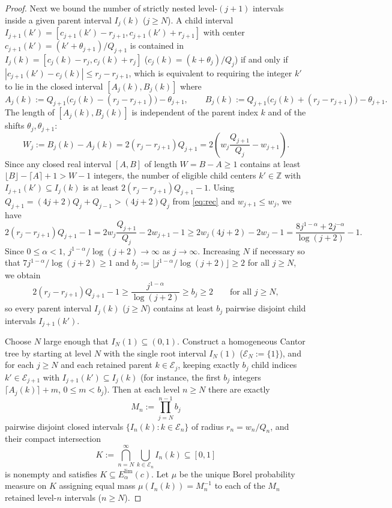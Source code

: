 \documentclass[11pt]{article}
\theoremstyle{definition}
\theoremstyle{remark}
\newcommand{\Z}{\mathbb{Z}}
\begin{document}
\begin{proof}
Next we bound the number of strictly nested level-$(j+1)$ intervals inside a
given parent interval $I_j(k)$ ($j\ge N$). A child interval
$I_{j+1}(k')=[c_{j+1}(k')-r_{j+1},c_{j+1}(k')+r_{j+1}]$ with center
$c_{j+1}(k')=(k'+\theta_{j+1})/Q_{j+1}$ is contained in
$I_j(k)=[c_j(k)-r_j,c_j(k)+r_j]$ ($c_j(k)=(k+\theta_j)/Q_j$) if and only if
$|c_{j+1}(k')-c_j(k)|\le r_j-r_{j+1}$, which is equivalent to requiring the
integer $k'$ to lie in the closed interval $[A_j(k),B_j(k)]$ where
\[
A_j(k):=Q_{j+1}\bigl(c_j(k)-(r_j-r_{j+1})\bigr)-\theta_{j+1},\qquad
B_j(k):=Q_{j+1}\bigl(c_j(k)+(r_j-r_{j+1})\bigr)-\theta_{j+1}.
\]
The length of $[A_j(k),B_j(k)]$ is independent of the parent index $k$ and of
the shifts $\theta_j,\theta_{j+1}$:
\[
W_j:=B_j(k)-A_j(k)=2(r_j-r_{j+1})Q_{j+1}
=2\left(w_j\frac{Q_{j+1}}{Q_j}-w_{j+1}\right).
\]
Since any closed real interval $[A,B]$ of length $W=B-A\ge1$ contains at least
$\lfloor B\rfloor-\lceil A\rceil+1>W-1$ integers, the number of eligible child
centers $k'\in\Z$ with $I_{j+1}(k')\subseteq I_j(k)$ is at least
$2(r_j-r_{j+1})Q_{j+1}-1$. Using $Q_{j+1}=(4j+2)Q_j+Q_{j-1}>(4j+2)Q_j$ from
\eqref{eq:rec} and $w_{j+1}\le w_j$, we have
\[
2(r_j-r_{j+1})Q_{j+1}-1
=2w_j\frac{Q_{j+1}}{Q_j}-2w_{j+1}-1
\ge 2w_j(4j+2)-2w_j-1
=\frac{8j^{1-\alpha}+2j^{-\alpha}}{\log(j+2)}-1.
\]
Since $0\le\alpha<1$, $j^{1-\alpha}/\log(j+2)\to\infty$ as $j\to\infty$.
Increasing $N$ if necessary so that $7j^{1-\alpha}/\log(j+2)\ge1$ and
$b_j:=\lfloor j^{1-\alpha}/\log(j+2)\rfloor\ge2$ for all $j\ge N$, we obtain
\[
2(r_j-r_{j+1})Q_{j+1}-1\ge\frac{j^{1-\alpha}}{\log(j+2)}\ge b_j\ge2
\qquad\text{for all }j\ge N,
\]
so every parent interval $I_j(k)$ ($j\ge N$) contains at least $b_j$ pairwise
disjoint child intervals $I_{j+1}(k')$.

Choose $N$ large enough that $I_N(1)\subseteq(0,1)$. Construct a homogeneous
Cantor tree by starting at level $N$ with the single root interval $I_N(1)$
($\mathcal E_N:=\{1\}$), and for each $j\ge N$ and each retained parent
$k\in\mathcal E_j$, keeping exactly $b_j$ child indices $k'\in\mathcal E_{j+1}$
with $I_{j+1}(k')\subseteq I_j(k)$ (for instance, the first $b_j$ integers
$\lceil A_j(k)\rceil+m$, $0\le m<b_j$). Then at each level $n\ge N$ there are
exactly
\[
M_n:=\prod_{j=N}^{n-1}b_j
\]
pairwise disjoint closed intervals $\{I_n(k):k\in\mathcal E_n\}$ of radius
$r_n=w_n/Q_n$, and their compact intersection
\[
K:=\bigcap_{n=N}^\infty\bigcup_{k\in\mathcal E_n}I_n(k)\subseteq[0,1]
\]
is nonempty and satisfies $K\subseteq E_{\alpha}^{\mathrm{lim}}(c)$. Let $\mu$
be the unique Borel probability measure on $K$ assigning equal mass
$\mu(I_n(k))=M_n^{-1}$ to each of the $M_n$ retained level-$n$ intervals ($n\ge N$).


\end{proof}
\end{document}
